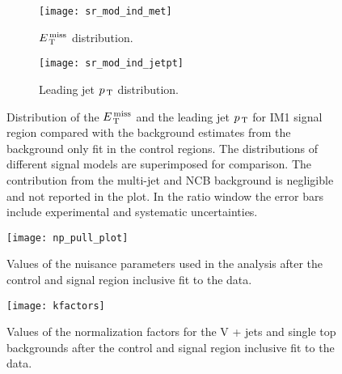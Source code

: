 \begin{figure}[!th]
  \centering
  \begin{subfigure}[t]{.48\linewidth}
    \texttt{[image: sr\_mod\_ind\_met]}
    \caption{$E_\mathrm{\, T}^\mathrm{\, miss}$ distribution.}
    \label{fig:sr_et_miss}
  \end{subfigure}
  \begin{subfigure}[t]{.48\linewidth}
    \texttt{[image: sr\_mod\_ind\_jetpt]}
    \caption{Leading jet $p_\mathrm{\, T}$ distribution.}
    \label{fig:sr_jet1_pt}
  \end{subfigure}
  \caption{Distribution of the $E_\mathrm{\, T}^\mathrm{\, miss}$ and the leading jet $p_\mathrm{\, T}$ for IM1 signal
    region compared with the background estimates from the background only fit
    in the control regions. The distributions of different signal models are
    superimposed for comparison. The contribution from the multi-jet and NCB
    background is negligible and not reported in the plot. In the ratio window
    the error bars include experimental and systematic uncertainties.}
  \label{fig:sr_plots}
\end{figure}
\begin{figure}[!th]
  \centering
  \texttt{[image: np\_pull\_plot]}
  \caption{Values of the nuisance parameters used in the analysis after the
    control and signal region inclusive fit to the data.}
  \label{fig:np_pull}
\end{figure}
\begin{figure}[!hb]
  \centering
  \texttt{[image: kfactors]}
  \caption{Values of the normalization factors for the V + jets and single top
    backgrounds after the control and signal region inclusive fit to the data.}
  \label{fig:kfactors}
\end{figure}
